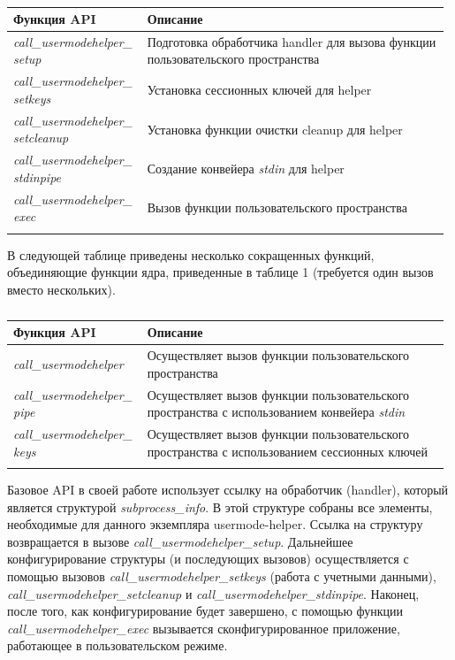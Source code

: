 \documentclass[a4paper,14pt]{extarticle}
\begin{document}
 	\begin{center}
 		\begin{longtable}[h!]{|p{0.3\linewidth}|p{ 0.68\linewidth}|}
 			\caption{}\\
 			\hline
 			{\bf Функция API} & {\bf Описание}\\
 			\hline
 			{\textit{call\_usermodehelper\_
 					setup}} & {Подготовка обработчика handler для вызова функции пользовательского пространства}\\
 			\hline
 			{\textit{call\_usermodehelper\_
 					setkeys}} & {Установка сессионных ключей для helper}\\
 			\hline
 			{\textit{call\_usermodehelper\_
 					setcleanup}} & {Установка функции очистки cleanup для helper}\\
 			\hline
 			{\textit{call\_usermodehelper\_
 					stdinpipe}} & {Создание конвейера \textit{stdin} для helper}\\
 			\hline
 			{\textit{call\_usermodehelper\_
 					exec}} & {Вызов функции пользовательского пространства}\\
 			\hline
 		\label{table1}
 		\end{longtable}
 	\end{center}
 		
 	В следующей таблице приведены несколько сокращенных функций, объединяющие функции ядра, приведенные в таблице 1 (требуется один вызов вместо нескольких).
 	
 	\begin{center}
 		\begin{longtable}[h!]{|p{0.3\linewidth}|p{ 0.68\linewidth}|}
 			\caption{}\\
 			\hline
 			{\bf Функция API} & {\bf Описание}\\
 			\hline
 			{\textit{call\_usermodehelper}} & {Осуществляет вызов функции пользовательского пространства}\\
 			\hline
 			{\textit{call\_usermodehelper\_
 					pipe}} & {Осуществляет вызов функции пользовательского пространства с использованием конвейера \textit{stdin}}\\
 			\hline
 			{\textit{call\_usermodehelper\_
 					keys}} & {Осуществляет вызов функции пользовательского пространства с использованием сессионных ключей}\\
 			\hline
 			\label{table2}
 		\end{longtable}
 	\end{center}
 		
 	Базовое API в своей работе использует ссылку на обработчик (handler), который является структурой \textit{subprocess\_info}. В этой структуре собраны все элементы, необходимые для данного экземпляра usermode-helper. Ссылка на структуру возвращается в вызове \textit{call\_usermodehelper\_setup}. Дальнейшее конфигурирование структуры (и последующих вызовов) осуществляется с помощью вызовов \textit{call\_usermodehelper\_setkeys} (работа с учетными данными), \textit{call\_usermodehelper\_setcleanup} и \textit{call\_usermodehelper\_stdinpipe}. Наконец, после того, как конфигурирование будет завершено, с помощью функции \textit{call\_usermodehelper\_exec} вызывается сконфигурированное приложение, работающее в пользовательском режиме.
 	
\end{document}
